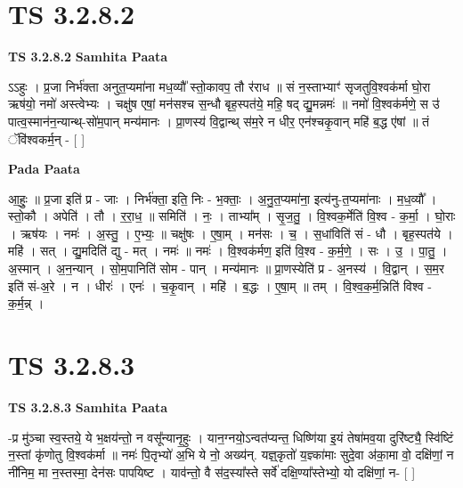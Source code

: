 \documentclass[17pt]{extarticle}
\begin{document}
\section*{ TS 3.2.8.2 }

\textbf{TS 3.2.8.2 } \newline
\textbf{Samhita Paata} \newline

ऽऽहुः । प्र॒जा निर्भ॑क्ता अनुत॒प्यमा॑ना मध॒व्यौ᳚ स्तो॒कावप॒ तौ र॑राध ॥ सं न॒स्ताभ्याꣳ॑ सृजतुवि॒श्वक॑र्मा घो॒रा ऋष॑यो॒ नमो॑ अस्त्वेभ्यः । चक्षु॑ष एषां॒ मन॑सश्च स॒न्धौ बृह॒स्पत॑ये॒ महि॒ षद् द्यु॒मन्नमः॑ ॥ नमो॑ वि॒श्वक॑र्मणे॒ स उ॑ पात्व॒स्मान॑न॒न्यान्थ्-सो॑म॒पान् मन्य॑मानः । प्रा॒णस्य॑ वि॒द्वान्थ् स॑म॒रे न धीर॒ एन॑श्चकृ॒वान् महि॑ ब॒द्ध ए॑षां ॥ तं ॅवि॑श्वकर्म॒न् - [  ] \newline

\textbf{Pada Paata} \newline

आ॒हुः॒ ॥ प्र॒जा इति॑ प्र - जाः । निर्भ॑क्ता॒ इति॒ निः - भ॒क्ताः॒ । अ॒नु॒त॒प्यमा॑ना॒ इत्य॑नु-त॒प्यमा॑नाः । म॒ध॒व्यौ᳚ । स्तो॒कौ । अपेति॑ । तौ । र॒रा॒ध॒ ॥ समिति॑ । नः॒ । ताभ्या᳚म् । सृ॒ज॒तु॒ । वि॒श्वक॒र्मेति॑ वि॒श्व - क॒र्मा॒ । घो॒राः । ऋष॑यः । नमः॑ । अ॒स्तु॒ । ए॒भ्यः॒ ॥ चक्षु॑षः । ए॒षा॒म् । मन॑सः । च॒ । स॒धांविति॑ सं - धौ । बृह॒स्पत॑ये । महि॑ । सत् । द्यु॒मदिति॑ द्यु - मत् । नमः॑ ॥ नमः॑ । वि॒श्वक॑र्मण॒ इति॑ वि॒श्व - क॒र्म॒णे॒ । सः । उ॒ । पा॒तु॒ । अ॒स्मान् । अ॒न॒न्यान् । सो॒म॒पानिति॑ सोम - पान् । मन्य॑मानः ॥ प्रा॒णस्येति॑ प्र - अ॒नस्य॑ । वि॒द्वान् । स॒म॒र इति॑ सं-अ॒रे । न । धीरः॑ । एनः॑ । च॒कृ॒वान् । महि॑ । ब॒द्धः । ए॒षा॒म् ॥ तम् । वि॒श्व॒क॒र्म॒न्निति॑ विश्व - क॒र्म॒न्न् ।  \newline




\section*{ TS 3.2.8.3 }

\textbf{TS 3.2.8.3 } \newline
\textbf{Samhita Paata} \newline

-प्र मु॑ञ्चा स्व॒स्तये॒ ये भ॒क्षय॑न्तो॒ न वसू᳚न्यानृ॒हुः । यान॒ग्नयो॒ऽन्वत॑प्यन्त॒ धिष्णि॑या इ॒यं तेषा॑मव॒या दुरि॑ष्ट्यै॒ स्वि॑ष्टिं न॒स्तां कृ॑णोतु वि॒श्वक॑र्मा ॥ नमः॑ पि॒तृभ्यो॑ अ॒भि ये नो॒ अख्य॑न्. यज्ञ्॒कृतो॑ य॒ज्ञ्का॑माः सुदे॒वा अ॑का॒मा वो॒ दक्षि॑णां॒ न नी॑निम॒ मा न॒स्तस्मा॒ देन॑सः पापयिष्ट । याव॑न्तो॒ वै स॑द॒स्या᳚स्ते सर्वे॑ दक्षि॒ण्या᳚स्तेभ्यो॒ यो दक्षि॑णां॒ न-  [  ] \newline
\end{document}
